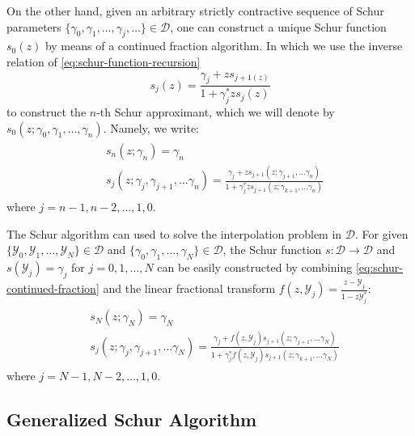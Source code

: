 \documentclass[
	preprint,%
	aps,
	prb,
	showpacs,	
	amsmath, amssymb]{revtex4-2}
\DeclareRobustCommand{\+}{\hstretch{1.25} {\boldsymbol {\mathrel{+}}}}
\newcommand{\Y}{ {\mathcal{Y}} }
\newcommand{\D}{ {\mathcal{D}} }
\begin{document}
On the other hand, given an arbitrary strictly contractive sequence 
of Schur parameters $\{\gamma_0, \gamma_1, \dots, \gamma_j, \dots\} \in \D$, 
one can construct a unique Schur function $s_0(z)$ by means of a continued 
fraction algorithm. In which we use the inverse relation of
\cref{eq:schur-function-recursion}
\begin{equation}\label{eq:inv-schur-function-recursion}
	s_j(z) = \frac{\gamma_j + zs_{j+1(z)}}{1 + \gamma_j^* z s_j(z)}
\end{equation}
to construct the $n$-th Schur approximant, 
which we will denote by 
$s_0(z; \gamma_0,\gamma_1, \dots, \gamma_n)$. Namely, we write:
\begin{align}\label{eq:schur-continued-fraction}
\begin{split}
	&s_n(z;\gamma_n) = \gamma_n \\
	&s_j(z;\gamma_j,\gamma_{j+1},\dots \gamma_n) 
	= \frac{\gamma_j + zs_{j+1}(z;\gamma_{j+1},\dots \gamma_n)}
		{1 + \gamma_j^* z s_{j+1}(z;\gamma_{k+1},\dots \gamma_n)}
\end{split}
\end{align}
where $j = n-1, n-2, \dots, 1, 0$.

The Schur algorithm can used to solve the interpolation problem in $\D$. 
For given $\{\Y_0, \Y_1, \dots ,\Y_N\} \in \D$ 
and $\{\gamma_0, \gamma_1, \dots ,\gamma_N\} \in \D$, the Schur function 
 $s:\D \to \D$ and $s(\Y_j) = \gamma_j$ 
for $j = 0,1,\dots,N$ can be easily constructed by combining 
\cref{eq:schur-continued-fraction} and the linear fractional transform 
$f(z, \Y_j) = \frac{z - \Y_j}{1 - z\Y_j^*}$:
\begin{align}\label{eq:schur-interpolation}
	\begin{split}
		&s_N(z;\gamma_N) = \gamma_N \\
		&s_j(z;\gamma_j,\gamma_{j+1},\dots \gamma_N) 
		= \frac{\gamma_j + f(z,\Y_{j})s_{j+1}(z;\gamma_{j+1},\dots \gamma_N)}
			{1 + \gamma_j^* f(z,\Y_{j})s_{j+1}(z;\gamma_{k+1},\dots \gamma_N)}
	\end{split}
\end{align}
where $j = N-1, N-2, \dots, 1, 0$.


\subsection{Generalized Schur Algorithm}
\label{subsec:generalized-schur-algorithm}
\end{document}
